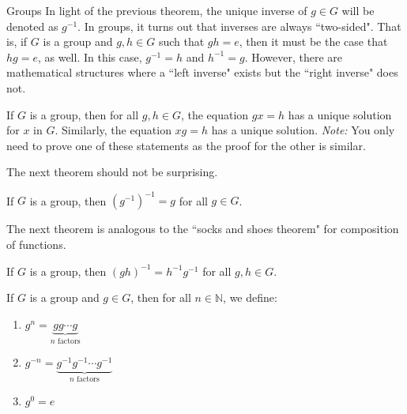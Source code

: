 \begin{section}{Groups}
In light of the previous theorem, the unique inverse of $g\in G$ will be denoted as $g^{-1}$. In groups, it turns out that inverses are always ``two-sided". That is, if $G$ is a group and $g,h\in G$ such that $gh=e$, then it must be the case that $hg=e$, as well. In this case, $g^{-1}=h$ and $h^{-1}=g$. However, there are mathematical structures where a ``left inverse" exists but the ``right inverse" does not. 

\begin{theorem}\label{thm:unique_soln}
If $G$ is a group, then for all $g,h\in G$, the equation $gx=h$ has a unique solution for $x$ in $G$. Similarly, the equation $xg=h$ has a unique solution. \emph{Note:} You only need to prove one of these statements as the proof for the other is similar.
\end{theorem}

%
%

The next theorem should not be surprising.

\begin{theorem}
If $G$ is a group, then $(g^{-1})^{-1}=g$ for all $g\in G$.
\end{theorem}

The next theorem is analogous to the ``socks and shoes theorem" for composition of functions.

\begin{theorem}
If $G$ is a group, then $(gh)^{-1}=h^{-1}g^{-1}$ for all $g,h\in G$.
\end{theorem}

\begin{definition}\label{def:exponents}
If $G$ is a group and $g\in G$, then for all $n\in \mathbb{N}$, we define:
\begin{enumerate}[label=\textrm{(\alph*)}]
\item $g^n=\underbrace{gg\cdots g}_{n\text{ factors}}$
\item $g^{-n}=\underbrace{g^{-1}g^{-1}\cdots g^{-1}}_{n\text{ factors}}$
\item $g^0=e$
\end{enumerate}
\end{definition}


\end{section}
